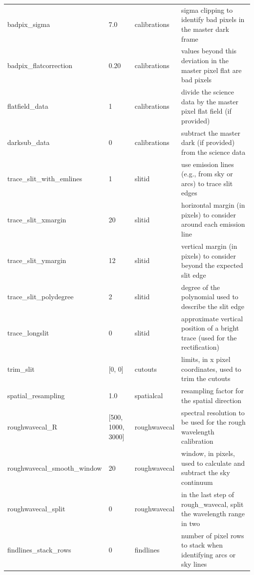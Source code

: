 \documentclass[a4paper]{article}
\begin{document}
\begin{sloppypar}
\begin{table}
{\begin{tabular}{llll}
    badpix\_sigma                 & 7.0           & calibrations     & sigma clipping to identify bad pixels in the master dark frame \\
    badpix\_flatcorrection        & 0.20          & calibrations     & values beyond this deviation in the master pixel flat are bad pixels \\
    flatfield\_data               & 1             & calibrations     & divide the science data by the master pixel flat field (if provided) \\
    darksub\_data                 & 0             & calibrations     & subtract the master dark (if provided) from the science data \\
    trace\_slit\_with\_emlines    & 1             & slitid           & use emission lines (e.g., from sky or arcs) to trace slit edges \\
    trace\_slit\_xmargin          & 20            & slitid           & horizontal margin (in pixels) to consider around each emission line \\
    trace\_slit\_ymargin          & 12            & slitid           & vertical margin (in pixels) to consider beyond the expected slit edge \\
    trace\_slit\_polydegree       & 2             & slitid           & degree of the polynomial used to describe the slit edge \\
    trace\_longslit               & 0             & slitid           & approximate vertical position of a bright trace (used for the rectification) \\
    trim\_slit                    & [0, 0]        & cutouts          & limits, in x pixel coordinates, used to trim the cutouts \\
    spatial\_resampling           & 1.0           & spatialcal       & resampling factor for the spatial direction \\
    roughwavecal\_R               & [500, 1000, 3000] & roughwavecal & spectral resolution to be used for the rough wavelength calibration \\
    roughwavecal\_smooth\_window  & 20            & roughwavecal     & window, in pixels, used to calculate and subtract the sky continuum \\
    roughwavecal\_split           & 0             & roughwavecal     & in the last step of rough\_wavecal, split the wavelength range in two \\
    findlines\_stack\_rows        & 0             & findlines        & number of pixel rows to stack when identifying arcs or sky lines \\

\end{tabular}}
\end{table}
\end{sloppypar}
\end{document}
